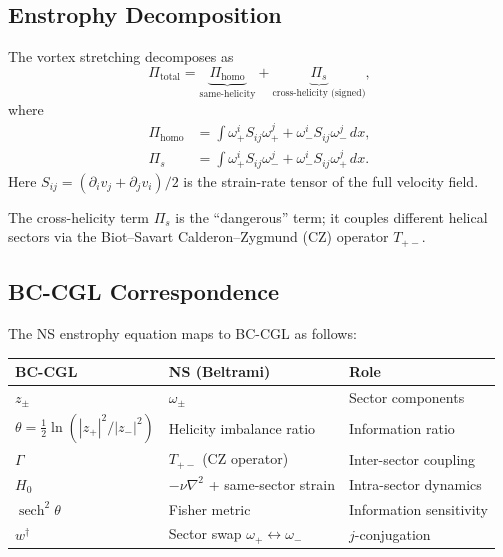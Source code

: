 \documentclass[12pt,a4paper]{article}
\theoremstyle{definition}
\newcommand{\sech}{\operatorname{sech}}
\begin{document}
\subsection{Enstrophy Decomposition}

The vortex stretching decomposes as
\begin{equation}\label{eq:Pi_decomp}
  \Pi_{\mathrm{total}} = \underbrace{\Pi_{\mathrm{homo}}}_{\text{same-helicity}} + \underbrace{\Pi_s}_{\text{cross-helicity (signed)}},
\end{equation}
where
\begin{align}
  \Pi_{\mathrm{homo}} &= \int \omega_+^i S_{ij} \omega_+^j + \omega_-^i S_{ij} \omega_-^j \,dx, \\
  \Pi_s &= \int \omega_+^i S_{ij} \omega_-^j + \omega_-^i S_{ij} \omega_+^j \,dx.
\end{align}
Here $S_{ij} = (\partial_i v_j + \partial_j v_i)/2$ is the strain-rate tensor of the full velocity field.

The cross-helicity term $\Pi_s$ is the ``dangerous'' term; it couples different helical sectors via the Biot--Savart Calderon--Zygmund (CZ) operator $T_{+-}$.

\subsection{BC-CGL Correspondence}

The NS enstrophy equation maps to BC-CGL as follows:

\begin{center}
\begin{tabular}{lll}
\toprule
\textbf{BC-CGL} & \textbf{NS (Beltrami)} & \textbf{Role} \\
\midrule
$z_\pm$ & $\omega_\pm$ & Sector components \\
$\theta = \frac{1}{2}\ln(|z_+|^2/|z_-|^2)$ & Helicity imbalance ratio & Information ratio \\
$\Gamma$ & $T_{+-}$ (CZ operator) & Inter-sector coupling \\
$H_0$ & $-\nu\nabla^2$ + same-sector strain & Intra-sector dynamics \\
$\sech^2\theta$ & Fisher metric & Information sensitivity \\
$w^\dagger$ & Sector swap $\omega_+ \leftrightarrow \omega_-$ & $j$-conjugation \\
\bottomrule
\end{tabular}
\end{center}
\end{document}
